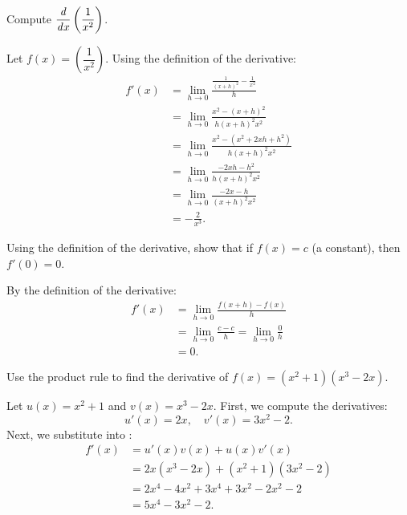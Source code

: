\begin{problem}
  Compute $\dfrac{\mathit{d} }{\mathit{d} x} \left( \dfrac{1}{x^{2}} \right)$.
  \vspace{\baselineskip}

  Let $f(x) = \left( \dfrac{1}{x^{2}} \right)$. Using the definition of the derivative:
    \begin{align*}
      f'(x) &= \lim_{h \to 0}\frac{\frac{1}{(x+h)^2} - \frac{1}{x^2}}{h}\\
            &= \lim_{h \to 0}\frac{x^2 - (x+h)^2}{h(x+h)^2x^2}\\
            &= \lim_{h \to 0}\frac{x^2 - (x^2 + 2xh + h^2)}{h(x+h)^2x^2}\\
            &= \lim_{h \to 0}\frac{-2xh - h^2}{h(x+h)^2x^2}\\
            &= \lim_{h \to 0}\frac{-2x - h}{(x+h)^2x^2}\\
            &= -\frac{2}{x^3}.
    \end{align*}
\end{problem}

\begin{problem}
  Using the definition of the derivative, show that if $f(x) = c$ (a constant), then $f'(0) = 0$.
  \vspace{\baselineskip}

  By the definition of the derivative:
    \begin{align*}
      f'(x) &= \lim_{h \to 0}\frac{f(x+h)-f(x)}{h}\\
            &= \lim_{h \to 0}\frac{c-c}{h} = \lim_{h \to 0}\frac{0}{h}\\
            &= 0.
    \end{align*}
\end{problem}

\begin{problem}
  Use the product rule to find the derivative of $f(x) = (x^{2} + 1)(x^{3} - 2x)$.
  \vspace{\baselineskip}

  Let $u(x) = x^2 + 1$ and $v(x) = x^3 - 2x$. First, we compute the derivatives:
  \[
    u'(x) = 2x, \quad v'(x) = 3x^2 - 2.
  \]
  Next, we substitute into :
    \begin{align*}
    f'(x) &= u'(x)v(x) + u(x)v'(x)\\
          &= 2x(x^3 - 2x) + (x^2 + 1)(3x^2 - 2)\\
          &= 2x^4 - 4x^2 + 3x^4 + 3x^2 - 2x^2 - 2\\
          &= 5x^4 - 3x^2 - 2.
    \end{align*}
\end{problem}

